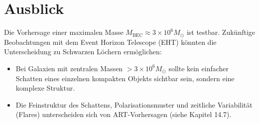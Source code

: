 \section{Ausblick}

Die Vorhersage einer maximalen Masse \( M_{\text{BEC}} \approx 3 \times 10^6 M_{\odot} \) 
ist testbar. Zukünftige Beobachtungen mit dem Event Horizon Telescope (EHT) 
könnten die Unterscheidung zu Schwarzen Löchern ermöglichen:

\begin{itemize}
    \item Bei Galaxien mit zentralen Massen \( > 3 \times 10^6 M_{\odot} \) 
          sollte kein einfacher Schatten eines einzelnen kompakten Objekts 
          sichtbar sein, sondern eine komplexe Struktur.
    \item Die Feinstruktur des Schattens, Polarisationsmuster und 
          zeitliche Variabilität (Flares) unterscheiden sich von 
          ART-Vorhersagen (siehe Kapitel 14.7).
\end{itemize}